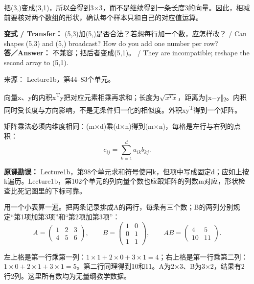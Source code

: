 把(3,)变成(3,1)，所以会得到3\ensuremath{\times}3，而不是继续得到一条长度3的向量。因此，相减前要核对两个数组的形状，确认每个样本只和自己的对应值运算。


\textbf{变式 / Transfer：} (5,3)加(5,)是否合法？若想每行加一个数，应怎样改？ / Can shapes (5,3) and (5,) broadcast? How do you add one number per row?\\

\textbf{答／Answer：} 不兼容；把后者变成(5,1)。 / They are incompatible; reshape the second array to (5,1).


来源： Lecture1b，第44–83个单元。








向量x、y的内积x\textsuperscript{T}y把对应元素相乘再求和；长度为\(\sqrt{x^T x}\)，距离为‖x\ensuremath{-}y‖\textsubscript{2}。内积同时受长度与方向影响，不是无条件归一化的相似度。外积xy\textsuperscript{T}得到一个矩阵。


矩阵乘法必须内维度相同：(m\ensuremath{\times}d)乘(d\ensuremath{\times}n)得到(m\ensuremath{\times}n)，每格是左行与右列的点积：
\[
c_{ij}=\sum_{k=1}^{d}a_{ik}b_{kj}.\tag{1.1}
\]


\textbf{原课勘误：} Lecture1b，第98个单元求和符号使用k，但项中写成固定d；应如上按k遍历。Lecture1b，第102个单元的列向量个数也应跟矩阵的列数m对应，形状检查比死记图里的下标可靠。


用一个小表算一遍。把两条记录排成A的两行，每条有三个数；B的两列分别规定“第1项加第3项”和“第2项加第3项”：
\[
A=\begin{pmatrix}1&2&3\\4&5&6\end{pmatrix},\qquad
B=\begin{pmatrix}1&0\\0&1\\1&1\end{pmatrix},\qquad
AB=\begin{pmatrix}4&5\\10&11\end{pmatrix}.\tag{1.2}
\]


左上格是第一行乘第一列：\(1\times1+2\times0+3\times1=4\)；右上格是第一行乘第二列：\(1\times0+2\times1+3\times1=5\)。第二行同理得到10和11。A为2\ensuremath{\times}3、B为3\ensuremath{\times}2，结果有2行2列。这里所有数均为无量纲教学数据。



